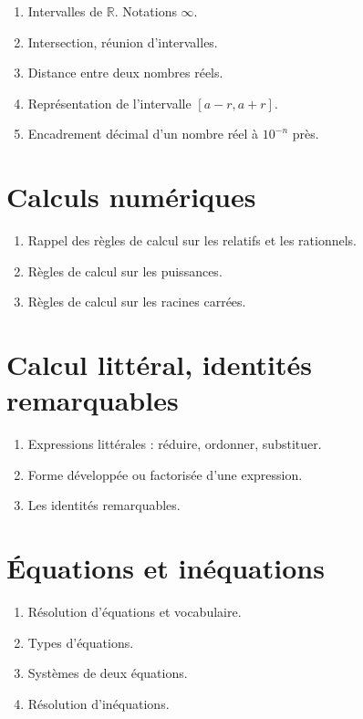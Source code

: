 \documentclass[10pt,a4paper]{article}
\begin{document}
\begin{enumerate}
\item Intervalles de $\mathbb{R}$. Notations $\infty$.
\item Intersection, réunion d'intervalles.
\item Distance entre deux nombres réels.
\item Représentation de l'intervalle $[a - r , a + r]$.
\item Encadrement décimal d'un nombre réel à $10^{-n}$ près.
\end{enumerate}



\section{Calculs numériques}

 

\begin{enumerate}
\item Rappel des règles de calcul sur les relatifs et les rationnels.
\item Règles de calcul sur les puissances.
\item Règles de calcul sur les racines carrées.
\end{enumerate}




\section{Calcul littéral, identités remarquables}

\begin{enumerate}
\item Expressions littérales : réduire, ordonner, substituer.
\item Forme développée ou factorisée d'une expression.
\item Les identités remarquables.
\end{enumerate}


\section{Équations et inéquations}


\begin{enumerate}
\item Résolution d'équations et vocabulaire.
\item Types d'équations.
\item Systèmes de deux équations.
\item Résolution d'inéquations.
\end{enumerate}
\end{document}
